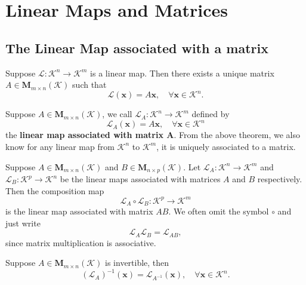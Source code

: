 	\chapter{Linear Maps and Matrices}
	\section{The Linear Map associated with a matrix}
	\begin{theoremenv}
		Suppose $\mathcal{L}:\mathcal{K}^n \to \mathcal{K}^m$ is a linear map. Then there exists a unique matrix $A \in \bm{M}_{m \times n}(\mathcal{K})$ such that \[\mathcal{L}(\bm{x}) = A\bm{x}, \quad \forall \bm{x} \in \mathcal{K}^n.\]
	\end{theoremenv}

	\begin{remarkenv}
		Suppose $A\in \bm{M}_{m \times n}(\mathcal{K})$, we call $\mathcal{L}_A:\mathcal{K}^n \to \mathcal{K}^m$ defined by \[\mathcal{L}_A(\bm{x}) = A\bm{x}, \quad \forall \bm{x} \in \mathcal{K}^n\] the \textbf{linear map associated with matrix A}. From the above theorem, we also know for any linear map from $\mathcal{K}^n$ to $\mathcal{K}^m$, it is uniquely associated to a matrix.
	\end{remarkenv}
	\begin{propositionenv}
		Suppose $A\in \bm{M}_{m \times n}(\mathcal{K})$ and $B \in \bm{M}_{n \times p}(\mathcal{K})$. Let $\mathcal{L}_A: \mathcal{K}^n \to \mathcal{K}^m$ and $\mathcal{L}_B: \mathcal{K}^p \to \mathcal{K}^n$ be the linear maps associated with matrices $A$ and $B$ respectively. Then the composition map \[\mathcal{L}_A \circ \mathcal{L}_B: \mathcal{K}^p \to \mathcal{K}^m\] is the linear map associated with matrix $AB$. We often omit the symbol $\circ$ and just write 
		\[\mathcal{L}_A \mathcal{L}_B = \mathcal{L}_{AB},\]
		since matrix multiplication is associative.
	\end{propositionenv}
	\begin{propositionenv}
		Suppose $A \in \bm{M}_{m \times n}(\mathcal{K})$ is invertible, then
		\[
		\left( \mathcal{L}_A\right)^{-1}(\bm{x}) = \mathcal{L}_{A^{-1}}(\bm{x}), \quad \forall \bm{x} \in \mathcal{K}^n.
		\]
	\end{propositionenv}

